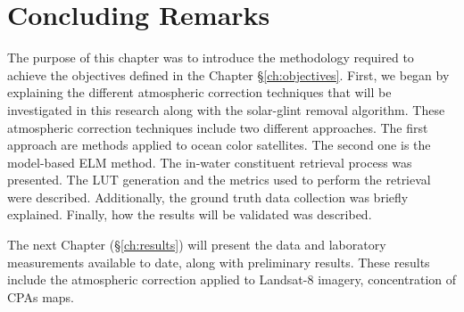 





\section{Concluding Remarks}
The purpose of this chapter was to introduce the methodology required to achieve the objectives defined in the Chapter \S\ref{ch:objectives}. First, we began by explaining the different atmospheric correction techniques that will be investigated in this research along with the solar-glint removal algorithm. These atmospheric correction techniques include two different approaches. The first approach are methods applied to ocean color satellites. The second one is the model-based ELM method. The in-water constituent retrieval process was presented. The LUT generation and the metrics used to perform the retrieval were described. Additionally, the ground truth data collection was briefly explained. Finally, how the results will be validated was described. 

The next Chapter (\S\ref{ch:results}) will present the data and laboratory measurements available to date, along with preliminary results. These results include the atmospheric correction applied to Landsat-8 imagery, concentration of CPAs maps.


